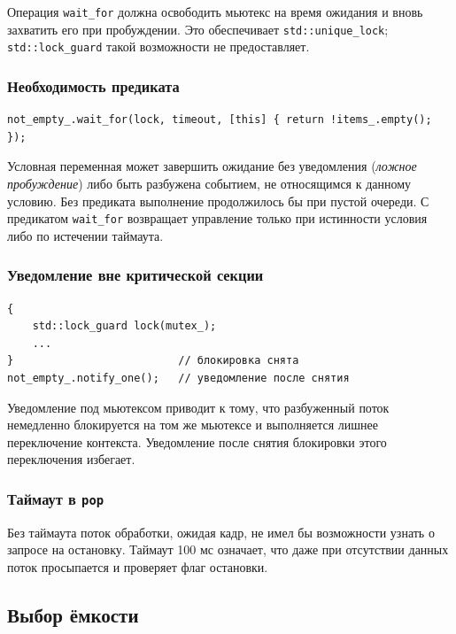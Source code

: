 \documentclass[11pt,a4paper]{article}
\theoremstyle{definition}
\theoremstyle{remark}
\begin{document}
Операция \texttt{wait\_for} должна освободить мьютекс на время ожидания и
вновь захватить его при пробуждении. Это обеспечивает
\texttt{std::unique\_lock}; \texttt{std::lock\_guard} такой возможности не
предоставляет.

\subsubsection{Необходимость предиката}

\begin{lstlisting}
not_empty_.wait_for(lock, timeout, [this] { return !items_.empty(); });
\end{lstlisting}

Условная переменная может завершить ожидание без уведомления
(\emph{ложное пробуждение}) либо быть разбужена событием, не относящимся к
данному условию. Без предиката выполнение продолжилось бы при пустой очереди.
С предикатом \texttt{wait\_for} возвращает управление только при истинности
условия либо по истечении таймаута.

\subsubsection{Уведомление вне критической секции}

\begin{lstlisting}
{
    std::lock_guard lock(mutex_);
    ...
}                          // блокировка снята
not_empty_.notify_one();   // уведомление после снятия
\end{lstlisting}

Уведомление под мьютексом приводит к тому, что разбуженный поток немедленно
блокируется на том же мьютексе и выполняется лишнее переключение контекста.
Уведомление после снятия блокировки этого переключения избегает.

\subsubsection{Таймаут в \texttt{pop}}

Без таймаута поток обработки, ожидая кадр, не имел бы возможности узнать о
запросе на остановку. Таймаут 100 мс означает, что даже при отсутствии данных
поток просыпается и проверяет флаг остановки.

\subsection{Выбор ёмкости}
\end{document}
